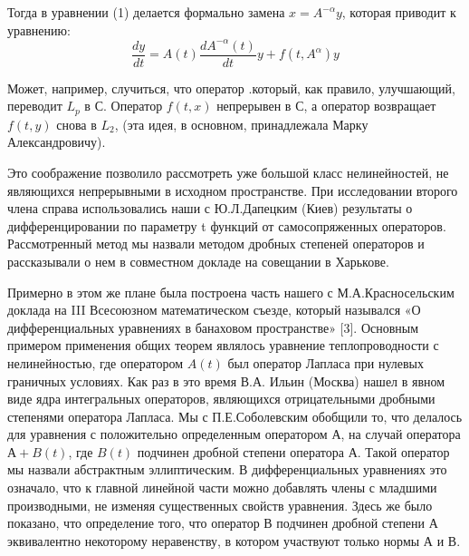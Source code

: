 Тогда в уравнении (1) делается формально замена $x = A^{-\alpha} y$, которая приводит к уравнению:
$$\frac{dy}{dt} = A(t)\frac{d A^{-\alpha} (t)}{dt} y + f(t, A^{\alpha}) y$$

Может, например, случиться, что оператор   .который, как правило, улучшающий, переводит $L_p$ в $С$. Оператор $f(t,x)$ непрерывен в $С$, а оператор   возвращает $f(t, y)$ снова в $L_2$, (эта идея, в основном, принадлежала Марку Александровичу).

Это соображение позволило рассмотреть уже большой класс нелинейностей, не являющихся непрерывными в исходном пространстве. При исследовании второго члена справа использовались наши с Ю.Л.Дапецким (Киев) результаты о дифференцировании по параметру t функций от самосопряженных операторов. Рассмотренный метод мы назвали методом дробных степеней операторов и рассказывали о нем в совместном докладе на совещании в Харькове.

Примерно в этом же плане была построена часть нашего с М.А.Красносельским доклада на III Всесоюзном математическом съезде, который назывался «О дифференциальных уравнениях в банаховом пространстве» [3]. Основным примером применения общих теорем являлось уравнение теплопроводности с нелинейностью, где оператором $A(t)$ был оператор Лапласа при нулевых граничных условиях. Как раз в это время В.А. Ильин (Москва) нашел в явном виде ядра интегральных операторов, являющихся отрицательными дробными степенями оператора Лапласа.
Мы с П.Е.Соболевским обобщили то, что делалось для уравнения с положительно определенным оператором $А$, на случай оператора $А+B(t)$, где $B(t)$ подчинен дробной степени оператора $А$. Такой оператор мы назвали абстрактным эллиптическим. В дифференциальных уравнениях это означало, что к главной линейной части можно добавлять члены с младшими производными, не изменяя существенных свойств уравнения. Здесь же было показано, что определение того, что оператор $В$ подчинен дробной степени $А$ эквивалентно некоторому неравенству, в котором участвуют только нормы $А$ и $В$.

